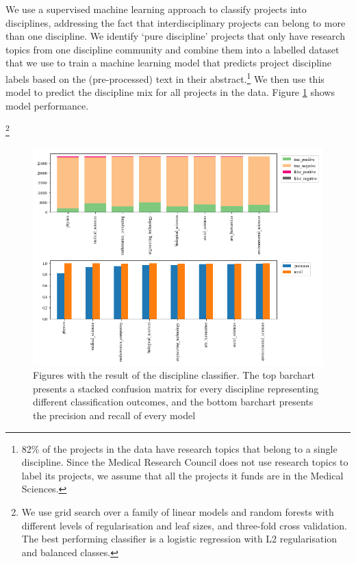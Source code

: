\documentclass[11pt]{article}
\begin{document}
We use a supervised machine learning approach to classify projects into disciplines, addressing the fact that interdisciplinary projects can belong to more than one discipline. We identify `pure discipline’ projects that only have research topics from one discipline community and combine them into a labelled dataset that we use to train a machine learning model that predicts project discipline labels based on the (pre-processed) text in their abstract.\footnote{82\% of the projects in the data have research topics that belong to a single discipline. Since the Medical Research Council does not use research topics to label its projects, we assume that all the projects it funds are in the Medical Sciences.} We then use this model to predict the discipline mix for all projects in the data. Figure \ref{fig:discipline_classifier} shows model performance.

\footnote{We use grid search over a family of linear models and random forests with different levels of regularisation and leaf sizes, and three-fold cross validation. The best performing classifier is a logistic regression with L2 regularisation and balanced classes.} 

\begin{figure}[!ht]
    \centering
    \includegraphics[width=\textwidth]{figures/fig_3_model_validation.png}
    \caption{Figures with the result of the discipline classifier. The top barchart presents a stacked confusion matrix for every discipline representing different classification outcomes, and the bottom barchart presents the precision and recall of every model}
    \label{fig:discipline_classifier}
\end{figure}
\end{document}
